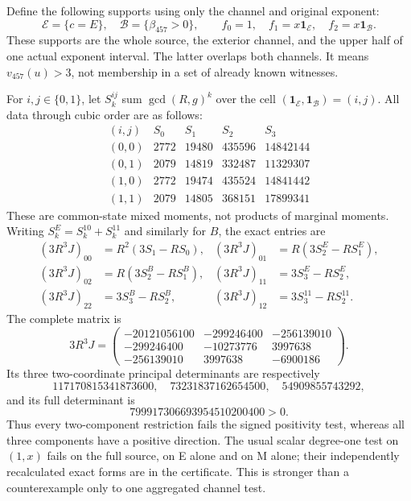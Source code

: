 Define the following supports using only the channel and original exponent:
\[
 \mathcal E=\{c=E\},\quad
 \mathcal B=\{\beta_{457}>0\},\qquad
 f_0=1,\quad f_1=x\mathbf1_{\mathcal E},\quad
 f_2=x\mathbf1_{\mathcal B}.
 \tag{E2}
\]
These supports are the whole source, the exterior channel, and the upper
half of one actual exponent interval. The latter overlaps both channels.
It means $v_{457}(u)>3$, not membership in a set of already known witnesses.

For $i,j\in\{0,1\}$, let $S_k^{ij}$ sum $\gcd(R,g)^k$ over the cell
$(\mathbf1_{\mathcal E},\mathbf1_{\mathcal B})=(i,j)$.
All data through cubic order are as follows:
\[
\begin{array}{c|rrrr}
(i,j)&S_0&S_1&S_2&S_3\\\hline
(0,0)&2772&19480&435596&14842144\\
(0,1)&2079&14819&332487&11329307\\
(1,0)&2772&19474&435524&14841442\\
(1,1)&2079&14805&368151&17899341
\end{array}\tag{E3}
\]
These are common-state mixed moments, not products of marginal moments.
Writing $S_k^E=S_k^{10}+S_k^{11}$ and similarly for $B$, the exact entries are
\[
\begin{aligned}
(3R^3J)_{00}&=R^2(3S_1-RS_0),&
(3R^3J)_{01}&=R(3S_2^E-RS_1^E),\\
(3R^3J)_{02}&=R(3S_2^B-RS_1^B),&
(3R^3J)_{11}&=3S_3^E-RS_2^E,\\
(3R^3J)_{22}&=3S_3^B-RS_2^B,&
(3R^3J)_{12}&=3S_3^{11}-RS_2^{11}.
\end{aligned}\tag{E4}
\]
The complete matrix is
\[
 \boxed{3R^3J=
 \begin{pmatrix}
 -20121056100&-299246400&-256139010\\
 -299246400&-10273776&3997638\\
 -256139010&3997638&-6900186
 \end{pmatrix}.}\tag{E5}
\]
Its three two-coordinate principal determinants are respectively
\[
117170815341873600,\quad73231837162654500,\quad54909855743292,
\]
and its full determinant is
\[
 \boxed{799917306693954510200400>0.}\tag{E6}
\]
Thus every two-component restriction fails the signed positivity test,
whereas all three components have a positive direction.
The usual scalar degree-one test on $(1,x)$ fails on the full source,
on E alone and on M alone; their independently recalculated exact forms
are in the certificate. This is stronger than a counterexample only to
one aggregated channel test.

